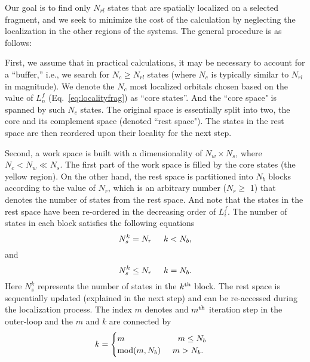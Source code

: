 \documentclass[journal=jacsat,manuscript=article]{achemso}
\begin{document}
Our goal is to find only $N_{rl}$ states that are spatially localized on a selected fragment, and we seek to minimize the cost of the calculation by neglecting the localization in the other regions of the systems. The general procedure is as follows:

First, we assume that in practical calculations, it may be necessary to account for a ``buffer,'' i.e., we search for $N_c \ge N_{rl}$ states (where $N_c$ is typically similar to $N_{rl}$ in magnitude).  We denote the $N_c$ most localized orbitals chosen based on the value of $L_n^f$ (Eq.~\ref{eq:localityfrag}) as ``core states''. And the ``core space" is spanned by such $N_c$ states. The original space is essentially split into two, the core and its complement space (denoted ``rest space"). The states in the rest space are then reordered upon their locality for the next step.

Second, a work space is built with a dimensionality of $N_w\times N_s$, where $N_c < N_w \ll N_s$. The first part of the work space is filled by the core states (the yellow region). On the other hand, the rest space is partitioned into $N_b$ blocks according to the value of $N_r$, which is an arbitrary number ($N_r\ge$ 1) that denotes the number of states from the rest space. And note that the states in the rest space have been re-ordered in the decreasing order of $L^{f}_i$. The number of states in each block satisfies the following equations
\begin{equation}\label{eq:stblock1}
    N^{k}_{s} = N_{r}  \hspace{5mm} k < N_b,
\end{equation}
and
\begin{equation}\label{eq:stblock2}
    N^{k}_{s} \le N_{r}  \hspace{5mm} k = N_b.
\end{equation}
Here $N_{s}^{k}$ represents the number of states in the $k^{\rm th}$ block. 
The rest space is sequentially updated (explained in the next step) and can be re-accessed during the localization process. The index $m$ denotes and $m^{\rm th}$ iteration step in the outer-loop and the $m$ and $k$ are connected by
\begin{equation}\label{eq:kblock}
k =
\begin{cases}
m \hspace{22.5mm} m\le N_b\\
{\rm mod}(m,N_b) \hspace{5mm} m > N_b.
\end{cases}
\end{equation}
\end{document}
